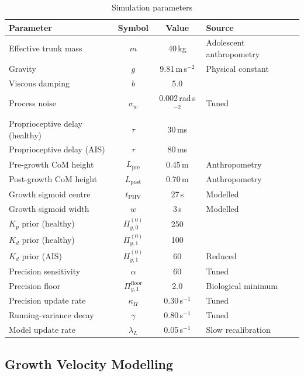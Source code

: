 \documentclass[12pt, letterpaper]{article}
\newcommand{\Piy}{\Pi_{y,1}}
\begin{document}
\begin{table}[H]
  \centering
  \caption{Simulation parameters}
  \label{tab:params}
  \renewcommand{\arraystretch}{1.3}
  \begin{tabular}{lccl}
    \toprule
    Parameter & Symbol & Value & Source \\
    \midrule
    Effective trunk mass & $m$ & 40\,kg & Adolescent anthropometry \\
    Gravity & $g$ & 9.81\,m\,s$^{-2}$ & Physical constant \\
    Viscous damping & $b$ & 5.0 & \citet{Peterka2002} \\
    Process noise & $\sigma_w$ & 0.002\,rad\,s$^{-2}$ & Tuned \\
    Proprioceptive delay (healthy) & $\tau$ & 30\,ms & \citet{Fitzpatrick1994} \\
    Proprioceptive delay (AIS) & $\tau$ & 80\,ms & \citet{Loram2005} \\
    Pre-growth CoM height & $L_{\mathrm{pre}}$ & 0.45\,m & Anthropometry \\
    Post-growth CoM height & $L_{\mathrm{post}}$ & 0.70\,m & Anthropometry \\
    Growth sigmoid centre & $t_{\mathrm{PHV}}$ & 27\,s & Modelled \\
    Growth sigmoid width & $w$ & 3\,s & Modelled \\
    $K_p$ prior (healthy) & $\Pi_{y,0}^{(0)}$ & 250 & \citet{Peterka2002} \\
    $K_d$ prior (healthy) & $\Piy^{(0)}$ & 100 & \citet{Peterka2002} \\
    $K_d$ prior (AIS) & $\Piy^{(0)}$ & 60 & Reduced \\
    Precision sensitivity & $\alpha$ & 60 & Tuned \\
    Precision floor & $\Piy^{\mathrm{floor}}$ & 2.0 & Biological minimum \\
    Precision update rate & $\kappa_\Pi$ & 0.30\,s$^{-1}$ & Tuned \\
    Running-variance decay & $\gamma$ & 0.80\,s$^{-1}$ & Tuned \\
    Model update rate & $\lambda_L$ & 0.05\,s$^{-1}$ & Slow recalibration \\
    \bottomrule
  \end{tabular}
\end{table}

\subsection{Growth Velocity Modelling}
\end{document}
